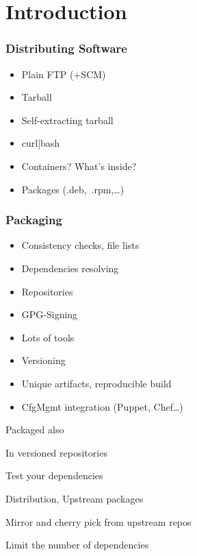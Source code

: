 \section{Introduction}
\begin{frame}
    \frametitle{Distributing Software}
    \begin{itemize}
        \item {Plain FTP (+SCM)}
        \item {Tarball}
        \item {Self-extracting tarball}
        \item {curl|bash}
        \item {Containers? What's inside?}
        \item {Packages (.deb,~.rpm,\dots)}
    \end{itemize}
\end{frame}
\begin{frame}
    \frametitle{Packaging}
    \begin{itemize}
        \item {Consistency checks, file lists}
        \item {Dependencies resolving}
        \item {Repositories}
        \item {GPG-Signing}
        \item {Lots of tools}
        \item {Versioning}
        \item {Unique artifacts, reproducible build}
        \item {CfgMgmt integration (Puppet, Chef\dots)}
    \end{itemize}
\end{frame}

\begin{iframe}[Dependencies]
\item{Packaged also}
\item{In versioned repositories}
\item{Test your dependencies}
\item{Distribution, Upstream packages}
\item{Mirror and cherry pick from upstream repos}
\item{Limit the number of dependencies}
\end{iframe}


